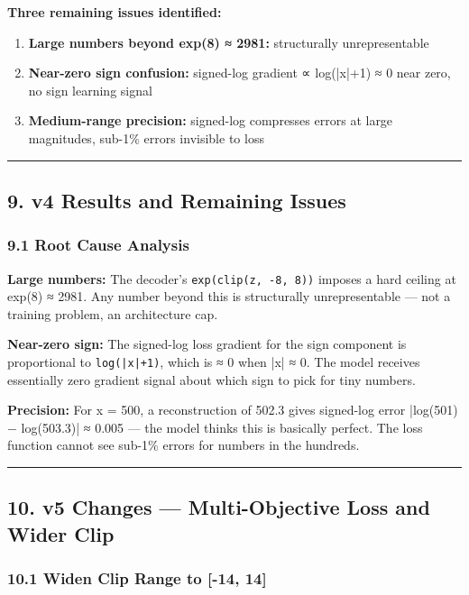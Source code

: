 \documentclass[11pt]{article}
\begin{document}
\textbf{Three remaining issues identified:}

\begin{enumerate}
\item \textbf{Large numbers beyond exp(8) ≈ 2981:} structurally unrepresentable
\item \textbf{Near-zero sign confusion:} signed-log gradient ∝ log(|x|+1) ≈ 0 near zero, no sign learning signal
\item \textbf{Medium-range precision:} signed-log compresses errors at large magnitudes, sub-1\% errors invisible to loss
\end{enumerate}


\noindent\rule{\textwidth}{0.4pt}


\subsection*{9. v4 Results and Remaining Issues}


\subsubsection*{9.1 Root Cause Analysis}


\textbf{Large numbers:} The decoder's \texttt{exp(clip(z, -8, 8))} imposes a hard ceiling at exp(8) ≈ 2981. Any number beyond this is structurally unrepresentable — not a training problem, an architecture cap.


\textbf{Near-zero sign:} The signed-log loss gradient for the sign component is proportional to \texttt{log(|x|+1)}, which is ≈ 0 when |x| ≈ 0. The model receives essentially zero gradient signal about which sign to pick for tiny numbers.


\textbf{Precision:} For x = 500, a reconstruction of 502.3 gives signed-log error |log(501) − log(503.3)| ≈ 0.005 — the model thinks this is basically perfect. The loss function cannot see sub-1\% errors for numbers in the hundreds.


\noindent\rule{\textwidth}{0.4pt}


\subsection*{10. v5 Changes — Multi-Objective Loss and Wider Clip}


\subsubsection*{10.1 Widen Clip Range to [-14, 14]}
\end{document}
